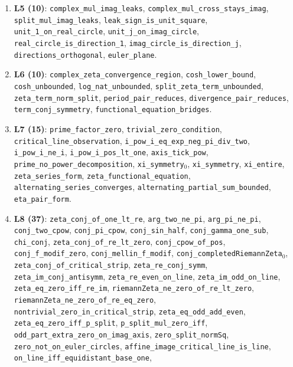 \documentclass{article}
\begin{document}
{\begin{sloppypar}
\begin{enumerate}
\texttt{complex\_imag\_axis\_coefficient}.
\item \textbf{L5 (10)}: \texttt{complex\_mul\_imag\_leaks},
\texttt{complex\_mul\_cross\_stays\_imag}, \texttt{split\_mul\_imag\_leaks},
\texttt{leak\_sign\_is\_unit\_square}, \texttt{unit\_1\_on\_real\_circle},
\texttt{unit\_j\_on\_imag\_circle}, \texttt{real\_circle\_is\_direction\_1},
\texttt{imag\_circle\_is\_direction\_j}, \texttt{directions\_orthogonal},
\texttt{euler\_plane}.
\item \textbf{L6 (10)}: \texttt{complex\_zeta\_convergence\_region},
\texttt{cosh\_lower\_bound}, \texttt{cosh\_unbounded},
\texttt{log\_nat\_unbounded}, \texttt{split\_zeta\_term\_unbounded},
\texttt{zeta\_term\_norm\_split}, \texttt{period\_pair\_reduces},
\texttt{divergence\_pair\_reduces}, \texttt{term\_conj\_symmetry},
\texttt{functional\_equation\_bridges}.
\item \textbf{L7 (15)}: \texttt{prime\_factor\_zero},
\texttt{trivial\_zero\_condition}, \texttt{critical\_line\_observation},
\texttt{i\_pow\_i\_eq\_exp\_neg\_pi\_div\_two}, \texttt{i\_pow\_i\_ne\_i},
\texttt{i\_pow\_i\_pos\_lt\_one}, \texttt{axis\_tick\_pow},
\texttt{prime\_no\_power\_decomposition}, \texttt{xi\_symmetry}\(_0\),
\texttt{xi\_symmetry}, \texttt{xi\_entire}, \texttt{zeta\_series\_form},
\texttt{zeta\_functional\_equation}, \texttt{alternating\_series\_converges},
\texttt{alternating\_partial\_sum\_bounded}, \texttt{eta\_pair\_form}.
\item \textbf{L8 (37)}: \texttt{zeta\_conj\_of\_one\_lt\_re},
\texttt{arg\_two\_ne\_pi}, \texttt{arg\_pi\_ne\_pi}, \texttt{conj\_two\_cpow},
\texttt{conj\_pi\_cpow}, \texttt{conj\_sin\_half}, \texttt{conj\_gamma\_one\_sub},
\texttt{chi\_conj}, \texttt{zeta\_conj\_of\_re\_lt\_zero},
\texttt{conj\_cpow\_of\_pos}, \texttt{conj\_f\_modif\_zero},
\texttt{conj\_mellin\_f\_modif}, \texttt{conj\_completedRiemannZeta}\(_0\),
\texttt{zeta\_conj\_of\_critical\_strip}, \texttt{zeta\_re\_conj\_symm},
\texttt{zeta\_im\_conj\_antisymm}, \texttt{zeta\_re\_even\_on\_line},
\texttt{zeta\_im\_odd\_on\_line}, \texttt{zeta\_eq\_zero\_iff\_re\_im},
\texttt{riemannZeta\_ne\_zero\_of\_re\_lt\_zero},
\texttt{riemannZeta\_ne\_zero\_of\_re\_eq\_zero},
\texttt{nontrivial\_zero\_in\_critical\_strip}, \texttt{zeta\_eq\_odd\_add\_even},
\texttt{zeta\_eq\_zero\_iff\_p\_split}, \texttt{p\_split\_mul\_zero\_iff},
\texttt{odd\_part\_extra\_zero\_on\_imag\_axis}, \texttt{zero\_split\_normSq},
\texttt{zero\_not\_on\_euler\_circles},
\texttt{affine\_image\_critical\_line\_is\_line},
\texttt{on\_line\_iff\_equidistant\_base\_one},

\end{enumerate}
\end{sloppypar}}
\end{document}
